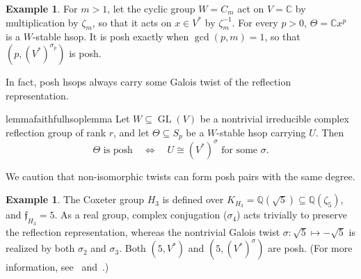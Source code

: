 \documentclass[11pt]{amsart}
\theoremstyle{definition}
\newtheorem{example}[theorem]{Example}
\newcommand{\C}{\mathbb C}\newcommand{\Q}{\mathbb Q}
\begin{document}
\begin{example}\label{ex:intro-cyclic}
For $m>1$, let the cyclic group $W=C_m$ act on $V=\C$ by multiplication by
$\zeta_m$, so that it acts on $x\in V^*$ by $\zeta_m^{-1}$.
For every $p>0$, $\Theta=\C x^p$ is a $W$-stable hsop.
It is posh exactly when $\gcd(p,m)=1$, so that $(p,(V^*)^{\sigma_p})$ is posh.
\end{example}

In fact, posh hsops always carry some Galois twist of the reflection representation.
\begin{restatable}{lemma}{faithfulhsoplemma}\label{a:cor:faithful-hsop}
Let $W\subseteq\operatorname{GL}(V)$ be a nontrivial irreducible complex reflection
group of rank $r$, and let $\Theta\subseteq S_p$ be a $W$-stable hsop
carrying $U$. Then
\[
 \Theta\text{ is posh}
 \quad\Longleftrightarrow\quad
 U\cong(V^*)^\sigma\text{ for some }\sigma.
\]
\end{restatable}


We caution that non-isomorphic twists can form posh pairs with the same degree.

\begin{example}\label{ex:intro-h3}
The Coxeter group $H_3$ is defined over $K_{H_3}=\mathbb{Q}(\sqrt{5})\subseteq\mathbb{Q}(\zeta_5)$, and
$\mathfrak f_{H_3}=5$.  As a real group, complex conjugation ($\sigma_4$) acts trivially to preserve the reflection representation, whereas the nontrivial Galois twist $\sigma: \sqrt{5}\mapsto-\sqrt{5}$ is realized by both $\sigma_2$ and $\sigma_3$. Both $(5,V^*)$ and $(5,(V^*)^\sigma)$ are posh. (For more information, see~\cite{BalagovicPuranik} and~.)
\end{example}
\end{document}
